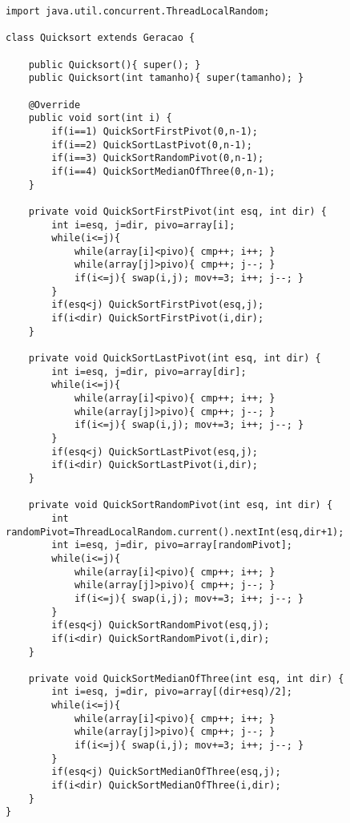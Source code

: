 \begin{adjustwidth}{-1cm}{-1cm} %
\begin{lstlisting}[caption={Código da aplicação}, label={lst:codigo_quicksort}]
import java.util.concurrent.ThreadLocalRandom;

class Quicksort extends Geracao {

    public Quicksort(){ super(); }
    public Quicksort(int tamanho){ super(tamanho); }

    @Override
    public void sort(int i) {
        if(i==1) QuickSortFirstPivot(0,n-1);
        if(i==2) QuickSortLastPivot(0,n-1);
        if(i==3) QuickSortRandomPivot(0,n-1);
        if(i==4) QuickSortMedianOfThree(0,n-1);
    }

    private void QuickSortFirstPivot(int esq, int dir) {
        int i=esq, j=dir, pivo=array[i];
        while(i<=j){
            while(array[i]<pivo){ cmp++; i++; }
            while(array[j]>pivo){ cmp++; j--; }
            if(i<=j){ swap(i,j); mov+=3; i++; j--; }
        }
        if(esq<j) QuickSortFirstPivot(esq,j);
        if(i<dir) QuickSortFirstPivot(i,dir);
    }

    private void QuickSortLastPivot(int esq, int dir) {
        int i=esq, j=dir, pivo=array[dir];
        while(i<=j){
            while(array[i]<pivo){ cmp++; i++; }
            while(array[j]>pivo){ cmp++; j--; }
            if(i<=j){ swap(i,j); mov+=3; i++; j--; }
        }
        if(esq<j) QuickSortLastPivot(esq,j);
        if(i<dir) QuickSortLastPivot(i,dir);
    }

    private void QuickSortRandomPivot(int esq, int dir) {
        int randomPivot=ThreadLocalRandom.current().nextInt(esq,dir+1);
        int i=esq, j=dir, pivo=array[randomPivot];
        while(i<=j){
            while(array[i]<pivo){ cmp++; i++; }
            while(array[j]>pivo){ cmp++; j--; }
            if(i<=j){ swap(i,j); mov+=3; i++; j--; }
        }
        if(esq<j) QuickSortRandomPivot(esq,j);
        if(i<dir) QuickSortRandomPivot(i,dir);
    }

    private void QuickSortMedianOfThree(int esq, int dir) {
        int i=esq, j=dir, pivo=array[(dir+esq)/2];
        while(i<=j){
            while(array[i]<pivo){ cmp++; i++; }
            while(array[j]>pivo){ cmp++; j--; }
            if(i<=j){ swap(i,j); mov+=3; i++; j--; }
        }
        if(esq<j) QuickSortMedianOfThree(esq,j);
        if(i<dir) QuickSortMedianOfThree(i,dir);
    }
}
\end{lstlisting}
\end{adjustwidth}


